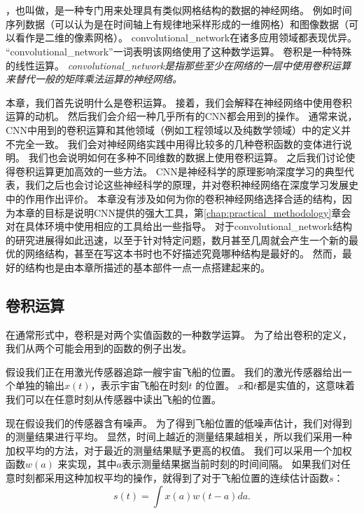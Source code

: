 \chapter{}
\label{chap:convolutional_networks}

\citep{LeCun89a}，也叫做，是一种专门用来处理具有类似网格结构的数据的神经网络。
例如时间序列数据（可以认为是在时间轴上有规律地采样形成的一维网格）和图像数据（可以看作是二维的像素网格）。
\gls{convolutional_network}在诸多应用领域都表现优异。
``\gls{convolutional_network}''一词表明该网络使用了这种数学运算。
卷积是一种特殊的线性运算。
\emph{\gls{convolutional_network}是指那些至少在网络的一层中使用卷积运算来替代一般的矩阵乘法运算的神经网络。}

本章，我们首先说明什么是卷积运算。
接着，我们会解释在神经网络中使用卷积运算的动机。
然后我们会介绍一种几乎所有的\gls{CNN}都会用到的操作。
通常来说，\gls{CNN}中用到的卷积运算和其他领域（例如工程领域以及纯数学领域）中的定义并不完全一致。
我们会对神经网络实践中用得比较多的几种卷积函数的变体进行说明。
我们也会说明如何在多种不同维数的数据上使用卷积运算。
之后我们讨论使得卷积运算更加高效的一些方法。
\gls{CNN}是神经科学的原理影响深度学习的典型代表，我们之后也会讨论这些神经科学的原理，并对卷积神经网络在深度学习发展史中的作用作出评价。
本章没有涉及如何为你的卷积神经网络选择合适的结构，因为本章的目标是说明\gls{CNN}提供的强大工具，第\ref{chap:practical_methodology}章会对在具体环境中使用相应的工具给出一些指导。
对于\gls{convolutional_network}结构的研究进展得如此迅速，以至于针对特定问题，数月甚至几周就会产生一个新的最优的网络结构，甚至在写这本书时也不好描述究竟哪种结构是最好的。
然而，最好的结构也是由本章所描述的基本部件一点一点搭建起来的。

 
\section{卷积运算}
\label{sec:the_convolution_operation}

在通常形式中，卷积是对两个实值函数的一种数学运算。
为了给出卷积的定义，我们从两个可能会用到的函数的例子出发。

假设我们正在用激光传感器追踪一艘宇宙飞船的位置。
我们的激光传感器给出一个单独的输出$x(t)$，表示宇宙飞船在时刻$t$ 的位置。
$x$和$t$都是实值的，这意味着我们可以在任意时刻从传感器中读出飞船的位置。

现在假设我们的传感器含有噪声。
为了得到飞船位置的低噪声估计，我们对得到的测量结果进行平均。
显然，时间上越近的测量结果越相关，所以我们采用一种加权平均的方法，对于最近的测量结果赋予更高的权值。
我们可以采用一个加权函数$w(a)$ 来实现，其中$a$表示测量结果据当前时刻的时间间隔。
如果我们对任意时刻都采用这种加权平均的操作，就得到了对于飞船位置的连续估计函数$s$：
\begin{equation}
s(t) = \int x(a)w(t-a)da.
\end{equation}

